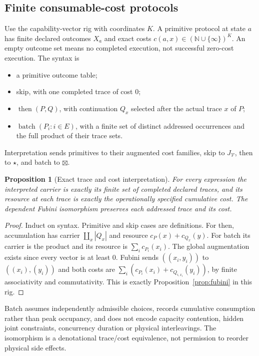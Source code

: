 \documentclass[11pt,a4paper]{article}
\newtheorem{proposition}[theorem]{Proposition}
\theoremstyle{definition}
\newcommand{\V}{\mathcal V}
\newcommand{\starc}{\mathbin{\star}}
\begin{document}
\subsection{Finite consumable-cost protocols}
Use the capability-vector rig with coordinates $K$. A primitive protocol at
state $a$ has finite declared outcomes $X_a$ and exact costs
$c(a,x)\in(\mathbb N\cup\{\infty\})^K$. An empty outcome set means no
completed execution, not successful zero-cost execution. The syntax is
\begin{itemize}
\item a primitive outcome table;
\item skip, with one completed trace of cost $0$;
\item $\operatorname{then}(P,Q)$, with continuation $Q_x$ selected after the
actual trace $x$ of $P$;
\item $\operatorname{batch}(P_i:i\in E)$, with a finite set of distinct
addressed occurrences and the full product of their trace sets.
\end{itemize}
Interpretation sends primitives to their augmented cost families, skip to
$J_\V$, then to $\starc$, and batch to $\boxtimes$.

\begin{proposition}[Exact trace and cost interpretation]\label{prop:cost}
For every expression the interpreted carrier is exactly its finite set of
completed declared traces, and its resource at each trace is exactly the
operationally specified cumulative cost. The dependent Fubini isomorphism
preserves each addressed trace and its cost.
\end{proposition}
\begin{proof}
Induct on syntax. Primitive and skip cases are definitions. For then,
accumulation has carrier $\coprod_x|Q_x|$ and resource
$c_P(x)+c_{Q_x}(y)$. For batch its carrier is the product and its resource is
$\sum_i c_{P_i}(x_i)$. The global augmentation exists since every vector is
at least $0$. Fubini sends $((x_i,y_i))$ to $((x_i),(y_i))$ and both costs
are $\sum_i(c_{P_i}(x_i)+c_{Q_{i,x_i}}(y_i))$, by finite associativity and
commutativity. This is exactly Proposition~\ref{prop:fubini} in this rig.
\end{proof}
Batch assumes independently admissible choices, records cumulative consumption
rather than peak occupancy, and does not encode capacity contention, hidden
joint constraints, concurrency duration or physical interleavings. The
isomorphism is a denotational trace/cost equivalence, not permission to reorder
physical side effects.
\end{document}

